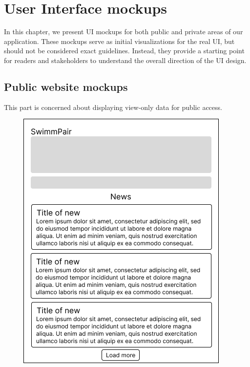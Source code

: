 \section{User Interface mockups}
In this chapter, we present UI mockups for both public and private areas of our application. These mockups serve as initial visualizations for the real UI, but should not be considered exact guidelines. Instead, they provide a starting point for readers and stakeholders to understand the overall direction of the UI design.
\subsection*{Public website mockups}
This part is concerned about displaying view-only data for public access.
\begin{figure}[h]	
	\centering	
    \includegraphics[scale=0.457]{img/def-U-Main.png}

\end{figure}
